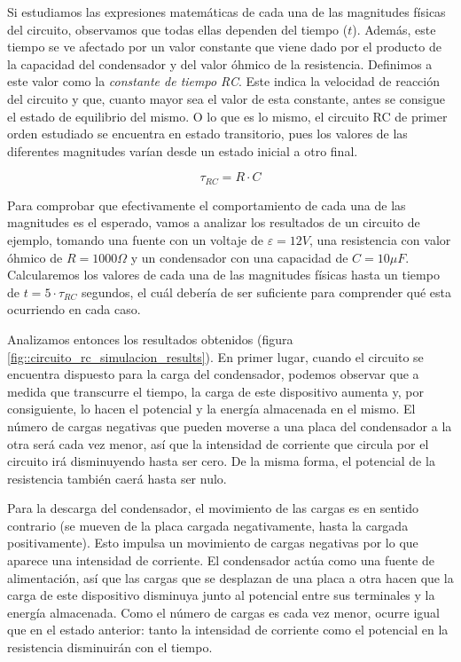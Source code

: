 \documentclass[../main.tex]{subfiles}
\begin{document}
Si estudiamos las expresiones matemáticas de cada una de las magnitudes físicas del circuito, observamos que todas ellas dependen del tiempo ($t$). Además, este tiempo se ve afectado por un valor constante que viene dado por el producto de la capacidad del condensador y del valor óhmico de la resistencia. Definimos a este valor como la \textit{constante de tiempo RC}. Este indica la velocidad de reacción del circuito y que, cuanto mayor sea el valor de esta constante, antes se consigue el estado de equilibrio del mismo. O lo que es lo mismo, el circuito RC de primer orden estudiado se encuentra en estado transitorio, pues los valores de las diferentes magnitudes varían desde un estado inicial a otro final.

\begin{equation}
    \tau_{RC} = R \cdot C
    \label{eqq::constante_tiempo_rc}
\end{equation}

Para comprobar que efectivamente el comportamiento de cada una de las magnitudes es el esperado, vamos a analizar los resultados de un circuito de ejemplo, tomando una fuente con un voltaje de $\varepsilon=12V$, una resistencia con valor óhmico de $R=1000\Omega$ y un condensador con una capacidad de $C=10 \mu F$. Calcularemos los valores de cada una de las magnitudes físicas hasta un tiempo de $t=5 \cdot \tau_{RC}$ segundos, el cuál debería de ser suficiente para comprender qué esta ocurriendo en cada caso.

Analizamos entonces los resultados obtenidos (figura \ref{fig::circuito_rc_simulacion_results}). En primer lugar, cuando el circuito se encuentra dispuesto para la carga del condensador, podemos observar que a medida que transcurre el tiempo, la carga de este dispositivo aumenta y, por consiguiente, lo hacen el potencial y la energía almacenada en el mismo. El número de cargas negativas que pueden moverse a una placa del condensador a la otra será cada vez menor, así que la intensidad de corriente que circula por el circuito irá disminuyendo hasta ser cero. De la misma forma, el potencial de la resistencia también caerá hasta ser nulo. 

Para la descarga del condensador, el movimiento de las cargas es en sentido contrario (se mueven de la placa cargada negativamente, hasta la cargada positivamente). Esto impulsa un movimiento de cargas negativas por lo que aparece una intensidad de corriente. El condensador actúa como una fuente de alimentación, así que las cargas que se desplazan de una placa a otra hacen que la carga de este dispositivo disminuya junto al potencial entre sus terminales y la energía almacenada. Como el número de cargas es cada vez menor, ocurre igual que en el estado anterior: tanto la intensidad de corriente como el potencial en la resistencia disminuirán con el tiempo.\\
\end{document}
